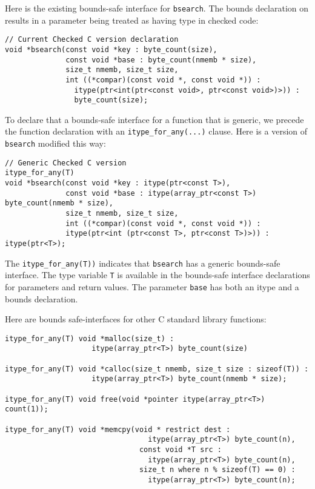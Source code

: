 Here is the existing bounds-safe interface for \lstinline+bsearch+. 
The bounds declaration on \uncheckedptrvoid{} results in a parameter being
treated as having type \arrayptrvoid{} in checked code:
\begin{lstlisting} 
// Current Checked C version declaration
void *bsearch(const void *key : byte_count(size),
              const void *base : byte_count(nmemb * size),
              size_t nmemb, size_t size,
              int ((*compar)(const void *, const void *)) :
                itype(ptr<int(ptr<const void>, ptr<const void>)>)) :
                byte_count(size);
\end{lstlisting}
To declare that a bounds-safe interface for a function that is generic, we precede
the function declaration with an \lstinline+itype_for_any(...)+ clause.
Here is a version of \lstinline+bsearch+ modified this way:
\begin{lstlisting}
// Generic Checked C version
itype_for_any(T)
void *bsearch(const void *key : itype(ptr<const T>),
              const void *base : itype(array_ptr<const T>) byte_count(nmemb * size),
              size_t nmemb, size_t size,
              int ((*compar)(const void *, const void *)) :
              itype(ptr<int (ptr<const T>, ptr<const T>)>)) : itype(ptr<T>);
\end{lstlisting}
The \lstinline+itype_for_any(T))+ indicates that \lstinline+bsearch+ has a generic
bounds-safe interface.   The type variable \lstinline+T+ is available in the
bounds-safe interface declarations for parameters and return values.  The parameter 
\lstinline+base+ has both an itype and a bounds declaration.

Here are bounds safe-interfaces for other C standard library
functions:
\begin{lstlisting}
itype_for_any(T) void *malloc(size_t) :
                    itype(array_ptr<T>) byte_count(size)

itype_for_any(T) void *calloc(size_t nmemb, size_t size : sizeof(T)) :
                    itype(array_ptr<T>) byte_count(nmemb * size);

itype_for_any(T) void free(void *pointer itype(array_ptr<T>) count(1));

itype_for_any(T) void *memcpy(void * restrict dest :
                                 itype(array_ptr<T>) byte_count(n),
                               const void *T src :
                                 itype(array_ptr<T>) byte_count(n),
                               size_t n where n % sizeof(T) == 0) :
                                 itype(array_ptr<T>) byte_count(n);
\end{lstlisting}

